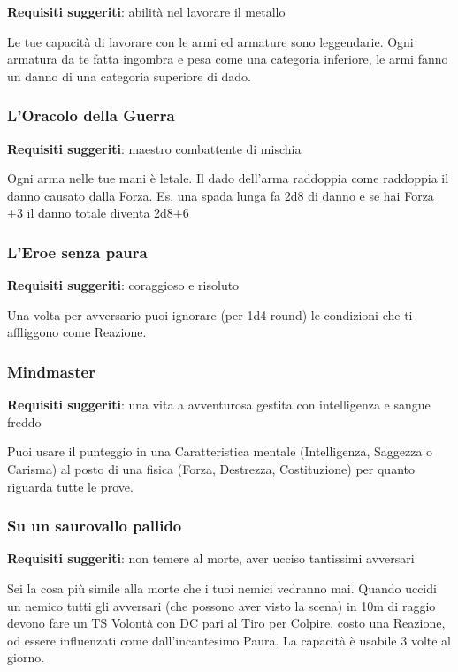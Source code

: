 \begin{multicols}{2}
\textbf{Requisiti suggeriti}: abilità nel lavorare il metallo

Le tue capacità di lavorare con le armi ed armature sono leggendarie.
Ogni armatura da te fatta ingombra e pesa come una categoria inferiore, le armi fanno un danno di una categoria superiore di dado.

\subsubsection{L'Oracolo della Guerra}

\textbf{Requisiti suggeriti}: maestro combattente di mischia

Ogni arma nelle tue mani è letale. Il dado dell'arma raddoppia come raddoppia il danno causato dalla Forza. Es. una spada lunga fa 2d8 di danno e se hai Forza +3 il danno totale diventa 2d8+6

\subsubsection{L'Eroe senza paura}

\textbf{Requisiti suggeriti}: coraggioso e risoluto

Una volta per avversario puoi ignorare (per 1d4 round) le condizioni che ti affliggono come Reazione.

\subsubsection{Mindmaster}

\textbf{Requisiti suggeriti}: una vita a avventurosa gestita con intelligenza e sangue freddo

Puoi usare il punteggio in una Caratteristica mentale (Intelligenza, Saggezza o Carisma) al posto di una fisica (Forza, Destrezza, Costituzione) per quanto riguarda tutte le prove.

\subsubsection*{Su un saurovallo pallido}

\textbf{Requisiti suggeriti}: non temere al morte, aver ucciso tantissimi avversari

Sei la cosa più simile alla morte che i tuoi nemici vedranno mai.
Quando uccidi un nemico tutti gli avversari (che possono aver visto la scena) in 10m di raggio devono fare un TS Volontà con DC pari al Tiro per Colpire, costo una Reazione, od essere influenzati come dall'incantesimo Paura. La capacità è usabile 3 volte al giorno.


\end{multicols}
